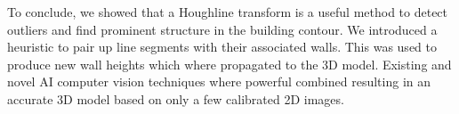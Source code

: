 \documentclass[10pt]{article}
\begin{document}
To conclude, we showed that a Houghline transform is a useful method to detect outliers and find prominent structure in the building contour. We introduced a heuristic to pair up line segments with their associated walls. This was used to produce new wall heights which where propagated to the 3D model.
Existing and novel AI computer vision techniques where powerful combined resulting in an accurate 3D model based on only a few calibrated 2D images. 


\end{document}
